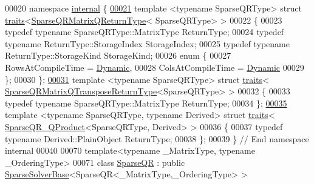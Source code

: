 \begin{DoxyCode}
00020 \textcolor{keyword}{namespace }\hyperlink{namespaceinternal}{internal} \{
\hyperlink{struct_eigen_1_1internal_1_1traits_3_01_sparse_q_r_matrix_q_return_type_3_01_sparse_q_r_type_01_4_01_4}{00021}   \textcolor{keyword}{template} <\textcolor{keyword}{typename} SparseQRType> \textcolor{keyword}{struct }\hyperlink{struct_eigen_1_1internal_1_1traits}{traits}<\hyperlink{struct_eigen_1_1_sparse_q_r_matrix_q_return_type}{SparseQRMatrixQReturnType}<
      SparseQRType> >
00022   \{
00023     \textcolor{keyword}{typedef} \textcolor{keyword}{typename} SparseQRType::MatrixType ReturnType;
00024     \textcolor{keyword}{typedef} \textcolor{keyword}{typename} ReturnType::StorageIndex StorageIndex;
00025     \textcolor{keyword}{typedef} \textcolor{keyword}{typename} ReturnType::StorageKind StorageKind;
00026     \textcolor{keyword}{enum} \{
00027       RowsAtCompileTime = \hyperlink{namespace_eigen_ad81fa7195215a0ce30017dfac309f0b2}{Dynamic},
00028       ColsAtCompileTime = \hyperlink{namespace_eigen_ad81fa7195215a0ce30017dfac309f0b2}{Dynamic}
00029     \};
00030   \};
\hyperlink{struct_eigen_1_1internal_1_1traits_3_01_sparse_q_r_matrix_q_transpose_return_type_3_01_sparse_q_r_type_01_4_01_4}{00031}   \textcolor{keyword}{template} <\textcolor{keyword}{typename} SparseQRType> \textcolor{keyword}{struct }\hyperlink{struct_eigen_1_1internal_1_1traits}{traits}<
      \hyperlink{struct_eigen_1_1_sparse_q_r_matrix_q_transpose_return_type}{SparseQRMatrixQTransposeReturnType}<SparseQRType> >
00032   \{
00033     \textcolor{keyword}{typedef} \textcolor{keyword}{typename} SparseQRType::MatrixType ReturnType;
00034   \};
\hyperlink{struct_eigen_1_1internal_1_1traits_3_01_sparse_q_r___q_product_3_01_sparse_q_r_type_00_01_derived_01_4_01_4}{00035}   \textcolor{keyword}{template} <\textcolor{keyword}{typename} SparseQRType, \textcolor{keyword}{typename} Derived> \textcolor{keyword}{struct }\hyperlink{struct_eigen_1_1internal_1_1traits}{traits}<
      \hyperlink{struct_eigen_1_1_sparse_q_r___q_product}{SparseQR\_QProduct}<SparseQRType, Derived> >
00036   \{
00037     \textcolor{keyword}{typedef} \textcolor{keyword}{typename} Derived::PlainObject ReturnType;
00038   \};
00039 \} \textcolor{comment}{// End namespace internal}
00040 
00070 \textcolor{keyword}{template}<\textcolor{keyword}{typename} \_MatrixType, \textcolor{keyword}{typename} \_OrderingType>
00071 \textcolor{keyword}{class }\hyperlink{group___sparse_q_r___module_class_eigen_1_1_sparse_q_r}{SparseQR} : \textcolor{keyword}{public} \hyperlink{group___sparse_core___module_class_eigen_1_1_sparse_solver_base}{SparseSolverBase}<SparseQR<\_MatrixType,\_OrderingType> >

\end{DoxyCode}
